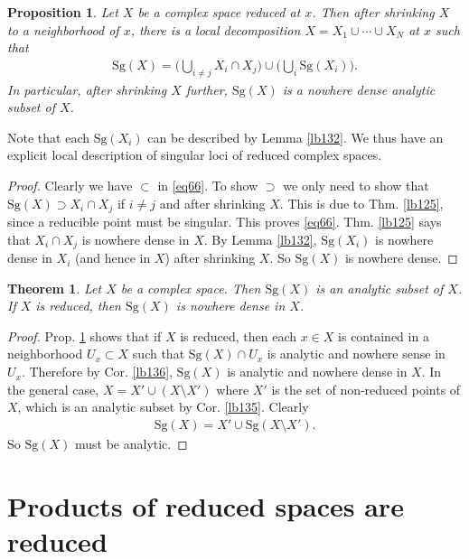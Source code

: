 \documentclass[12pt,b5paper,notitlepage]{report}
\theoremstyle{definition}
\theoremstyle{plain}
\newtheorem{thm}[df]{Theorem}
\newtheorem{pp}[df]{Proposition}
\newcommand{\Sg}{\mathrm{Sg}}
\numberwithin{equation}{section}
\begin{document}
\begin{pp}\label{lb134}
Let $X$ be a complex space reduced at $x$. Then after shrinking $X$ to a neighborhood of $x$, there is a local decomposition $X=X_1\cup\cdots\cup X_N$ at $x$ such that
\begin{align}\label{eq66}
\Sg(X)=\Big(\bigcup_{i\neq j}X_i\cap X_j\Big)\cup\Big(\bigcup_i\Sg(X_i)\Big).
\end{align}
In particular, after shrinking $X$ further, $\Sg(X)$ is a nowhere dense analytic subset of $X$.
\end{pp}

Note that each $\Sg(X_i)$ can be described by Lemma \ref{lb132}. We thus have an explicit local description of singular loci of reduced complex spaces.

\begin{proof}
Clearly we have $\subset$ in \eqref{eq66}. To show $\supset$ we only need to show that $\Sg(X)\supset X_i\cap X_j$ if $i\neq j$ and after shrinking $X$. This is due to Thm. \ref{lb125}, since a reducible point must be singular. This proves \eqref{eq66}. Thm. \ref{lb125} says that $X_i\cap X_j$ is nowhere dense in $X$. By Lemma \ref{lb132}, $\Sg(X_i)$ is nowhere dense in $X_i$ (and hence in $X$) after shrinking $X$. So $\Sg(X)$ is nowhere dense.
\end{proof}

\begin{thm}\label{lb179}
Let $X$ be a complex space. Then $\Sg(X)$ is an analytic subset of $X$. If $X$ is reduced, then $\Sg(X)$ is nowhere dense in $X$.
\end{thm}

\begin{proof}
Prop. \ref{lb134} shows that if $X$ is reduced, then each $x\in X$ is contained in a neighborhood $U_x\subset X$ such that $\Sg(X)\cap U_x$ is analytic and nowhere sense in $U_x$. Therefore by Cor. \ref{lb136}, $\Sg(X)$ is analytic and nowhere dense in $X$. In the general case, $X=X'\cup (X\setminus X')$ where $X'$ is the set of non-reduced points of $X$, which is an analytic subset by Cor. \ref{lb135}. Clearly
\begin{align}
\Sg(X)=X'\cup\Sg(X\setminus X').
\end{align}
So $\Sg(X)$ must be analytic.
\end{proof}



\section{Products of reduced spaces are reduced}
\end{document}
